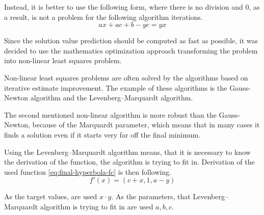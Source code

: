Instead,
it is better to use the following form, 
where there is no division and $0$, as a result, is not a problem for the following algorithm iterations.
\begin{equation}\label{eq:final-hyperbola-fc}
    ax + ac + b - yc = yx
\end{equation}

Since the solution value prediction should be computed as fast as possible,
it was decided to use the mathematics optimization approach transforming the problem into non-linear least squares problem.

Non-linear least squares problems are often solved by the algorithms based on iterative estimate improvement. 
The example of these algorithms is the Gauss-Newton algorithm\cite{gratton2007approximate} 
and the Levenberg–Marquardt algorithm\cite{marquardt1963algorithm}.

\noindent %
The second mentioned non-linear algorithm is more robust than the Gauss-Newton, 
because of the Marquardt parameter\cite{marquardt1963algorithm},
which means that in many cases it finds a solution even if it starts very far off the final minimum.

Using the Levenberg–Marquardt algorithm means, 
that it is necessary to know the derivation of the function, 
the algorithm is trying to fit in.
Derivation of the used function \ref{eq:final-hyperbola-fc} is then following.
\begin{equation}\label{eq:final-hyperbola-fd}
    f'(x) = (c+x, 1, a-y)
\end{equation}

As the target values, are used $x \cdot y$.
As the parameters, that Levenberg–Marquardt algorithm is trying to fit in are used $a,b,c$.